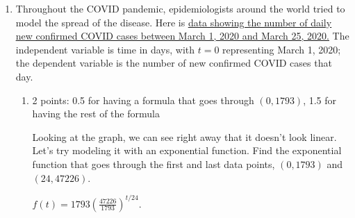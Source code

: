 \documentclass{article}
\makeatletter
\let\@href=\href
\renewcommand{\href}[2]{\@href{#1}{\ul{#2}}}
\makeatother
\begin{document}
\begin{enumerate}
\begin{enumerate}
    \begin{grading}
      1 point
    \end{grading}

    \begin{problem}[\vfill]
      By what percent does $v(t)$ increase each year? This is called the \emph{average annual percent change}. 
    \end{problem}

    \begin{solution}
      Each year, the amount is multiplied by $\left(\frac{120}{11}\right)^{1/13}$, so
      the average annual percent change is 
      $\left(\frac{120}{11}\right)^{1/13}-1\approx 0.202$, or about
      $20.2\%$.
    \end{solution}

  \end{enumerate}

  \pspace{\newpage}

\item 

  Throughout the COVID pandemic, epidemiologists around the world tried to model the spread of the disease. Here is \href{https://www.desmos.com/calculator/x400n2fvrh}{data showing the number of daily new confirmed COVID cases between March 1, 2020 and March 25, 2020.} The independent variable is time in days, with $t = 0$ representing March 1, 2020; the dependent variable is the number of new confirmed COVID cases that day.

  \begin{enumerate}
  \item

    \begin{grading}
      2 points: 0.5 for having a formula that goes through $(0, 1793)$, 1.5 for having the rest of the formula
    \end{grading}

    \begin{problem}[\vfill]
      Looking at the graph, we can see right away that it doesn't look linear. Let's try modeling it with an exponential function. Find the exponential function that goes through the first and last data points, $(0, 1793)$ and $(24, 47226)$.
    \end{problem}

    \begin{solution}
      $f(t) = 1793\left(\frac{47226}{1793}\right)^{t/24}$.
    \end{solution}


\end{enumerate}
\end{enumerate}
\end{document}
